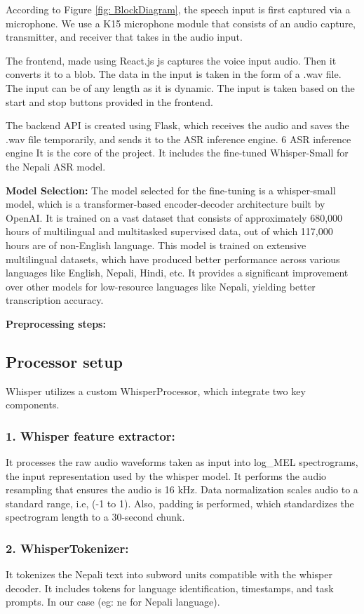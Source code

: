 According to Figure \ref{fig: BlockDiagram}, the speech input is first captured via a microphone. We use a K15 microphone module that consists of an audio capture,  transmitter, and receiver that takes in the audio input.

The frontend, made using React.js js captures the voice input audio. Then it converts it to a blob. The data in the input is taken in the form of a .wav file. The input can be of any length as it is dynamic. The input is taken based on the start and stop buttons provided in the frontend. 

The backend API is created using Flask, which receives the audio and saves the .wav file temporarily, and sends it to the ASR inference engine.
6
ASR inference engine
It is the core of the project. It includes the fine-tuned Whisper-Small for the Nepali ASR model.

 

\textbf{Model Selection:} The model selected for the fine-tuning is a whisper-small model, which is a transformer-based encoder-decoder architecture built by OpenAI. It is trained on a vast dataset that consists of approximately 680,000 hours of multilingual and multitasked supervised data, out of which 117,000 hours are of non-English language. This model is trained on extensive multilingual datasets, which have produced better performance across various languages like English, Nepali, Hindi, etc. It provides a significant improvement over other models for low-resource languages like Nepali, yielding better transcription accuracy. 


 \textbf{Preprocessing steps:} 
 \subsection{ Processor setup} 
 Whisper utilizes a custom WhisperProcessor, which integrate two key components.
 \subsubsection{1. Whisper feature extractor:} It processes the raw audio waveforms taken as input into log\_MEL spectrograms, the input representation used by the whisper model. It performs the audio resampling that ensures the audio is 16 kHz. Data normalization scales audio to a standard range, i.e, (-1 to 1). Also, padding is performed, which standardizes the spectrogram length to a 30-second chunk.\\

 \subsubsection{2. WhisperTokenizer:} It tokenizes the Nepali text into subword units compatible with the whisper decoder. It includes tokens for language identification, timestamps, and task prompts. In our case (eg: ne for Nepali language).\\

